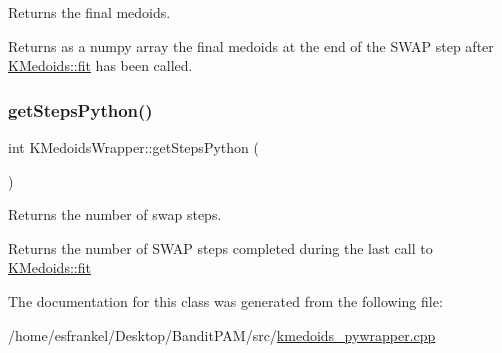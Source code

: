Returns the final medoids. 

Returns as a numpy array the final medoids at the end of the S\+W\+AP step after \hyperlink{classKMedoids_ae241800e72a6b4a677333ffbf06e1798}{K\+Medoids\+::fit} has been called. \mbox{\label{classKMedoidsWrapper_a25ac2830354eeae7963cdec34d0137e8}} 
\subsubsection{\texorpdfstring{get\+Steps\+Python()}{getStepsPython()}}
{\footnotesize\ttfamily int K\+Medoids\+Wrapper\+::get\+Steps\+Python (\begin{DoxyParamCaption}{ }\end{DoxyParamCaption})\hspace{0.3cm}{\ttfamily [inline]}}



Returns the number of swap steps. 

Returns the number of S\+W\+AP steps completed during the last call to \hyperlink{classKMedoids_ae241800e72a6b4a677333ffbf06e1798}{K\+Medoids\+::fit} 

The documentation for this class was generated from the following file\+:\begin{DoxyCompactItemize}
\item 
/home/esfrankel/\+Desktop/\+Bandit\+P\+A\+M/src/\hyperlink{kmedoids__pywrapper_8cpp}{kmedoids\+\_\+pywrapper.\+cpp}\end{DoxyCompactItemize}

